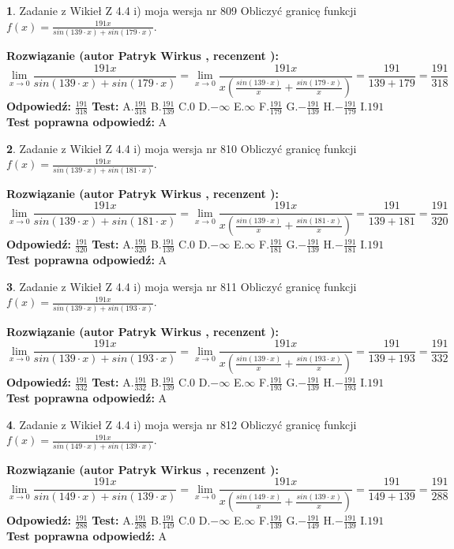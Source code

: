 \documentclass[12pt, a4paper]{article}
\theoremstyle{definition} %
\newtheorem{zad}{}
\newcommand{\zadStart}[1]{\begin{zad}#1\newline}
\newcommand{\zadStop}{\end{zad}}
\newcommand{\rozwStart}[2]{\noindent \textbf{Rozwiązanie (autor #1 , recenzent #2): }\newline}
\newcommand{\rozwStop}{\newline}
\newcommand{\odpStart}{\noindent \textbf{Odpowiedź:}\newline}
\newcommand{\odpStop}{\newline}
\newcommand{\testStart}{\noindent \textbf{Test:}\newline}
\newcommand{\testStop}{\newline}
\newcommand{\kluczStart}{\noindent \textbf{Test poprawna odpowiedź:}\newline}
\newcommand{\kluczStop}{\newline}
\begin{document}
\zadStart{Zadanie z Wikieł Z 4.4 i) moja wersja nr 809}
Obliczyć granicę funkcji $f(x)=\frac{191x}{sin(139\cdot x) +sin(179\cdot x)}$.
\zadStop
\rozwStart{Patryk Wirkus}{}
$$\lim\limits_{x\to 0}\frac{191x}{sin(139\cdot x) +sin(179\cdot x)}=\lim\limits_{x\to 0}\frac{191x}{x(\frac{sin(139\cdot x)}{x}+\frac{sin(179\cdot x)}{x})}=\frac{191}{139+179} = \frac{191}{318}$$
\rozwStop
\odpStart
$\frac{191}{318}$
\odpStop
\testStart
A.$\frac{191}{318}$
B.$\frac{191}{139}$
C.$0$
D.$-\infty$
E.$\infty$
F.$\frac{191}{179}$
G.$-\frac{191}{139}$
H.$-\frac{191}{179}$
I.$191$
\testStop
\kluczStart
A
\kluczStop



\zadStart{Zadanie z Wikieł Z 4.4 i) moja wersja nr 810}
Obliczyć granicę funkcji $f(x)=\frac{191x}{sin(139\cdot x) +sin(181\cdot x)}$.
\zadStop
\rozwStart{Patryk Wirkus}{}
$$\lim\limits_{x\to 0}\frac{191x}{sin(139\cdot x) +sin(181\cdot x)}=\lim\limits_{x\to 0}\frac{191x}{x(\frac{sin(139\cdot x)}{x}+\frac{sin(181\cdot x)}{x})}=\frac{191}{139+181} = \frac{191}{320}$$
\rozwStop
\odpStart
$\frac{191}{320}$
\odpStop
\testStart
A.$\frac{191}{320}$
B.$\frac{191}{139}$
C.$0$
D.$-\infty$
E.$\infty$
F.$\frac{191}{181}$
G.$-\frac{191}{139}$
H.$-\frac{191}{181}$
I.$191$
\testStop
\kluczStart
A
\kluczStop



\zadStart{Zadanie z Wikieł Z 4.4 i) moja wersja nr 811}
Obliczyć granicę funkcji $f(x)=\frac{191x}{sin(139\cdot x) +sin(193\cdot x)}$.
\zadStop
\rozwStart{Patryk Wirkus}{}
$$\lim\limits_{x\to 0}\frac{191x}{sin(139\cdot x) +sin(193\cdot x)}=\lim\limits_{x\to 0}\frac{191x}{x(\frac{sin(139\cdot x)}{x}+\frac{sin(193\cdot x)}{x})}=\frac{191}{139+193} = \frac{191}{332}$$
\rozwStop
\odpStart
$\frac{191}{332}$
\odpStop
\testStart
A.$\frac{191}{332}$
B.$\frac{191}{139}$
C.$0$
D.$-\infty$
E.$\infty$
F.$\frac{191}{193}$
G.$-\frac{191}{139}$
H.$-\frac{191}{193}$
I.$191$
\testStop
\kluczStart
A
\kluczStop



\zadStart{Zadanie z Wikieł Z 4.4 i) moja wersja nr 812}
Obliczyć granicę funkcji $f(x)=\frac{191x}{sin(149\cdot x) +sin(139\cdot x)}$.
\zadStop
\rozwStart{Patryk Wirkus}{}
$$\lim\limits_{x\to 0}\frac{191x}{sin(149\cdot x) +sin(139\cdot x)}=\lim\limits_{x\to 0}\frac{191x}{x(\frac{sin(149\cdot x)}{x}+\frac{sin(139\cdot x)}{x})}=\frac{191}{149+139} = \frac{191}{288}$$
\rozwStop
\odpStart
$\frac{191}{288}$
\odpStop
\testStart
A.$\frac{191}{288}$
B.$\frac{191}{149}$
C.$0$
D.$-\infty$
E.$\infty$
F.$\frac{191}{139}$
G.$-\frac{191}{149}$
H.$-\frac{191}{139}$
I.$191$
\testStop
\kluczStart
A
\kluczStop
\end{document}
